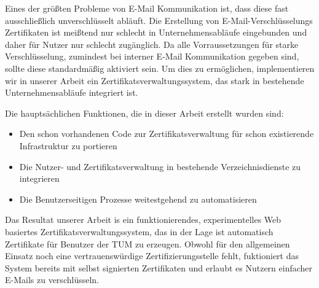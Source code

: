 \small

Eines der größten Probleme von E-Mail Kommunikation ist, dass diese fast ausschließlich unverschlüsselt abläuft.
Die Erstellung von E-Mail-Verschlüsselungs Zertifikaten ist meißtend nur schlecht in Unternehmensabläufe eingebunden und
daher für Nutzer nur schlecht zugänglich.
Da alle Vorraussetzungen für starke Verschlüsselung, zumindest bei interner E-Mail Kommunikation gegeben sind, sollte
diese standardmäßig aktiviert sein.
Um dies zu ermöglichen, implementieren wir in unserer Arbeit ein Zertifikatsverwaltungssystem, das stark in bestehende
Unternehmensabläufe integriert ist.

Die hauptsächlichen Funktionen, die in dieser Arbeit erstellt wurden sind:
\begin{itemize}
    \item Den schon vorhandenen Code zur Zertifikatsverwaltung für schon existierende Infrastruktur zu portieren
    \item Die Nutzer- und Zertifikatsverwaltung in bestehende Verzeichnisdienste zu integrieren
    \item Die Benutzerseitigen Prozesse weitestgehend zu automatisieren
\end{itemize}

Das Resultat unserer Arbeit is ein funktionierendes, experimentelles Web basiertes Zertifikatsverwaltungssystem, das in
der Lage ist automatisch Zertifikate für Benutzer der TUM zu erzeugen.
Obwohl für den allgemeinen Einsatz noch eine vertrauenswürdige Zertifizierungsstelle fehlt, fuktioniert das System
bereits mit selbst signierten Zertifikaten und erlaubt es Nutzern einfacher E-Mails zu verschlüsseln.
